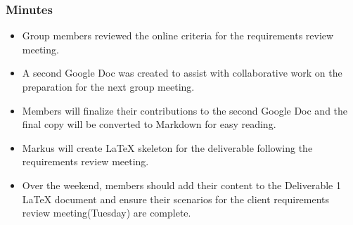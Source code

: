 \documentclass{article}
\begin{document}
\subsubsection{Minutes}
\begin{itemize}
\item Group members reviewed the online criteria for the requirements review meeting.
\item A second Google Doc was created to assist with collaborative work on the preparation for the next group meeting.
\item Members will finalize their contributions to the second Google Doc and the final copy will be converted to Markdown for easy reading.
\item Markus will create LaTeX skeleton for the deliverable following the requirements review meeting.
\item Over the weekend, members should add their content to the Deliverable 1 LaTeX document and ensure their scenarios for the client requirements review meeting(Tuesday) are complete.
\end{itemize}
\end{document}

